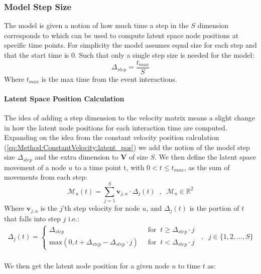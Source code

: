 \subsubsection{Model Step Size}
The model is given a notion of how much time a step in the $S$ dimension corresponds to which can be used to compute latent space node positions at specific time points. For simplicity the model assumes equal size for each step and that the start time is 0. Such that only a single step size is needed for the model:
\begin{equation}
    \Delta_{step} = \frac{t_{max}}{S}
\end{equation}
Where $t_{max}$ is the max time from the event interactions.

\paragraph{Latent Space Position Calculation}
\label{sec:Method:StepwiseLatentSpacePositions}
The idea of adding a step dimension to the velocity matrix means a slight change in how the latent node positions for each interaction time are computed. Expanding on the idea from the constant velocity position calculation (\ref{eq:Method:ConstantVelocity:latent_pos}) we add the notion of the model step size $\Delta_{step}$ and the extra dimension to $\textbf{V}$ of size $S$. 
We then define the latent space movement of a node $u$ to a time point t, with $0 < t \le t_{max}$, as the sum of movements from each step:
\begin{equation}
    \mathcal{M}_{u}(t) = \sum_{j = 1}^{S} \textbf{v}_{j, u} \cdot \Delta_{j}(t) \;\;,\;\; \mathcal{M}_{u} \in \mathbb{R}^2
    \label{eq:Method:ConstantVelocity:Movement}
\end{equation}
Where $\textbf{v}_{j,u}$ is the $j$'th step velocity for node $u$, and $\Delta_{j}(t)$ is the portion of $t$ that falls into step $j$ i.e.:
\begin{align}
    \Delta_{j}(t) = 
    \begin{cases}
        \Delta_{step} \;\; &\text{for} \;\; t \ge \Delta_{step} \cdot j\\
        \text{max}\left(0, t + \Delta_{step} - \Delta_{step} \cdot j\right) \;\; &\text{for} \;\; t < \Delta_{step} \cdot j
   \end{cases} \;\; , \;\; j \in \{1,2,...,S\}
   \label{eq:delta_t}
\end{align}
\\
We then get the latent node position for a given node $u$ to time $t$ as:
